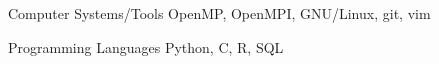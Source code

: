 

\begin{cvskills}

  \cvskill
    {Computer Systems/Tools}
    {OpenMP, OpenMPI, GNU/Linux, git, vim}

  \cvskill
    {Programming Languages} %
    {Python, C, R, SQL}

\end{cvskills}
